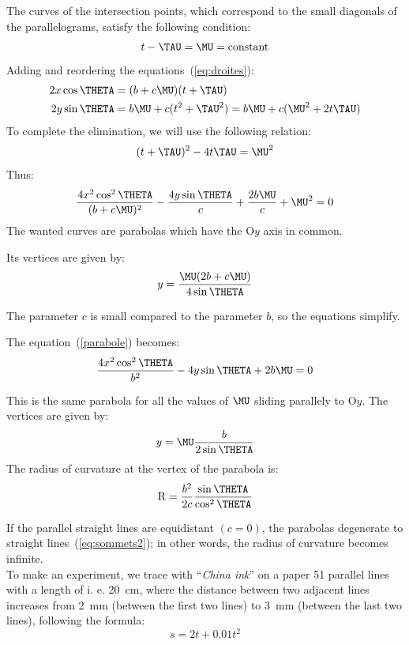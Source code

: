 \documentclass[%
    11pt,
    english,
    BCOR10mm,
    DIV12,
    bibliography=totoc,
    parskip=false,
    fleqn,
    smallheadings,
    headexclude,
    footexclude,
    oneside,
    dvipsnames,
    svgnames,
    x11names
]{pst-doc}
\begin{document}
{{{The curves of the intersection points, which correspond to the small diagonals of the parallelograms, satisfy the following condition:
\begin{equation*}
t-\TAU=\MU=\mathrm{constant}
\end{equation*}
\indent Adding and reordering the equations~(\ref{eq:droites}):
\begin{align*}
2x\cos\THETA&=(b+c\MU)(t+\TAU)\\
2y\sin\THETA&=b\MU+c(t^2+\TAU^2)=b\MU+c(\MU^2+2t\TAU)
\end{align*}
\indent To complete the elimination, we will use the following relation:
\begin{equation*}
(t+\TAU)^2-4t\TAU=\MU^2
\end{equation*}
Thus:
\begin{equation}
\frac{4x^2\cos^2\THETA}{(b+c\MU)^2}-\frac{4y\sin\THETA}{c}+\frac{2b\MU}{c}+\MU^2=0\label{parabole}
\end{equation}
\indent The wanted curves are parabolas which have the O$y$ axis in common.

Its vertices are given by:
\begin{equation}
y=\frac{\MU(2b+c\MU)}{4\sin\THETA}
\label{sommets}
\end{equation}

\itemBoua The parameter $c$ is small compared to the parameter $b$, so the equations simplify.

The equation~(\ref{parabole}) becomes:
\begin{equation*}
\frac{4x^2\cos^2\THETA}{b^2}-4y\sin\THETA+2b\MU=0
\end{equation*}

\indent This is the same parabola for all the values of $\MU$ sliding parallely to O$y$. The vertices are given by:
\begin{equation}
y=\MU \frac{b}{2\sin\THETA}
\label{eq:sommets2}
\end{equation}
The radius of curvature at the vertex of the parabola is:
\begin{equation*}
\mathrm{R}=\frac{b^2}{2c}\frac{\sin\THETA}{\cos^2\THETA}
\end{equation*}

\indent If the parallel straight lines are equidistant $(c=0)$, the parabolas degenerate to straight lines~(\ref{eq:sommets2}); in other words, the radius of curvature becomes infinite.
\\
\itemBoua To make an experiment, we trace with ``\textit{China ink}'' on a paper 51 parallel lines with a length of i. e. 20~cm, where the distance between two adjacent lines increases from 2~mm (between the first two lines) to 3~mm (between the last two lines), following the formula:
\begin{equation*}
s=2t+0.01t^2
\end{equation*}

}}}
\end{document}

